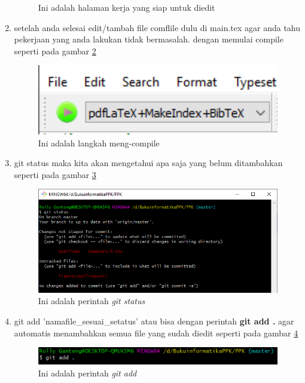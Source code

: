\begin{enumerate}
\begin{figure}[H]
		\caption{Ini adalah halaman kerja yang siap untuk diedit}
		\label{fig:p3}
		\end{figure}
\item setelah anda selesai edit/tambah file comflile dulu di main.tex agar anda tahu pekerjaan yang anda lakukan tidak bermasalah. dengan memulai compile seperti pada gambar \ref{fig:p4}
		\begin{figure}[H]
		\centering
		\includegraphics[width=1\textwidth]{figures/pullrequest/p4.PNG}
		\caption{Ini adalah langkah meng-compile}
		\label{fig:p4}
		\end{figure}
\item git status maka kita akan mengetahui apa saja yang belum ditambahkan seperti pada gambar \ref{fig:p5}
		\begin{figure}[H]
		\centering
		\includegraphics[width=1\textwidth]{figures/pullrequest/p5.PNG}
		\caption{Ini adalah perintah \textit{git status}}
		\label{fig:p5}
		\end{figure}
\item git add 'namafile\_sesuai\_setatus' atau bisa dengan perintah \textbf{git add .} agar automatis menambahkan semua file yang sudah diedit seperti pada gambar \ref{fig:p6}
		\begin{figure}[H]
		\centering
		\includegraphics[width=1\textwidth]{figures/pullrequest/p6.PNG}
		\caption{Ini adalah perintah \textit{git add}}
		\label{fig:p6}
		\end{figure}

\end{enumerate}
